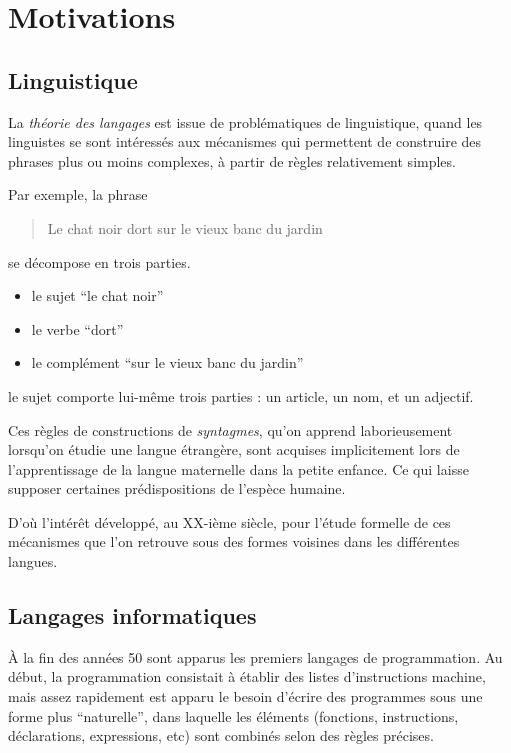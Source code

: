 \section{Motivations}

\subsection{Linguistique}

La \emph{théorie des langages} est issue de problématiques
de linguistique, quand les linguistes se sont intéressés 
aux mécanismes qui permettent de construire des phrases
plus ou moins complexes, à partir de règles relativement simples.

Par exemple, la phrase 
\begin{quote}
Le chat noir dort sur le vieux banc du jardin
\end{quote}
se décompose en trois parties.

\begin{itemize}
\item le sujet ``le chat noir''
\item le verbe ``dort''
\item le complément ``sur le vieux banc du jardin''
\end{itemize}
le sujet comporte lui-même trois parties : un article, un nom, et un adjectif.

Ces règles de constructions de \emph{syntagmes}, qu'on apprend
laborieusement lorsqu'on étudie une langue étrangère, sont acquises
implicitement lors de l'apprentissage de la langue maternelle dans la
petite enfance. Ce qui laisse supposer certaines prédispositions de
l'espèce humaine.

D'où l'intérêt développé, au XX-ième siècle, pour l'étude formelle de
ces mécanismes que l'on retrouve sous des formes voisines dans les
différentes langues.

\subsection{Langages informatiques}

À la fin des années 50 sont apparus les premiers langages de
programmation. Au début, la programmation consistait à établir des
listes d'instructions machine, mais assez rapidement est apparu le
besoin d'écrire des programmes sous une forme plus ``naturelle'', dans
laquelle les éléments (fonctions, instructions, déclarations,
expressions, etc) sont combinés selon des règles précises.

